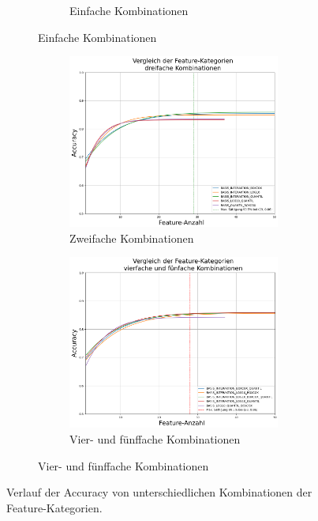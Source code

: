 \begin{figure}[htb]
\begin{subfigure}[b]{\textwidth}
\begin{subfigure}[b]{0.49\textwidth}
             \caption{Einfache Kombinationen}
         \end{subfigure}
     \end{subfigure}
     \hfill
     \begin{subfigure}[b]{\textwidth}
         \begin{subfigure}[b]{0.49\textwidth}
             \centering
             \includegraphics[width=\textwidth]{img/Plots/Feature Auswahl/Trendlinien Feature-Kategorien 2Up - Accuracy Plot.png}
             \caption{Zweifache Kombinationen}
         \end{subfigure}
         \hfill
         \begin{subfigure}[b]{0.49\textwidth}
             \centering
             \includegraphics[width=\textwidth]{img/Plots/Feature Auswahl/Trendlinien Feature-Kategorien 3Up - Accuracy Plot.png}
             \caption{Vier- und fünffache Kombinationen}
         \end{subfigure}
     \end{subfigure}
     \caption{Verlauf der Accuracy von unterschiedlichen Kombinationen der Feature-Kategorien.}
     \label{fig:plotCompKateg}
\end{figure}

